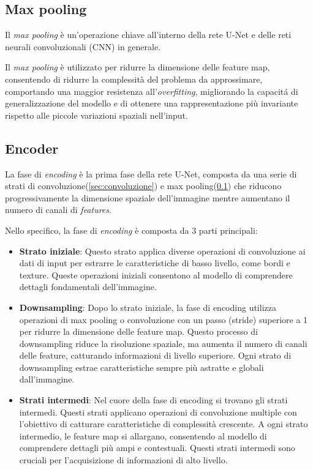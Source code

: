 
\subsection{Max pooling} %
\label{sec:Max pooling}
Il \textit{max pooling} è un'operazione chiave all'interno della rete U-Net e delle reti neurali convoluzionali (CNN) in generale.

Il \textit{max pooling} è utilizzato per ridurre la dimensione delle feature map, consentendo di ridurre la complessità del problema da approssimare, comportando una maggior resistenza all'\textit{overfitting}, migliorando la capacit\'a di generalizzazione del modello e di ottenere una rappresentazione più invariante rispetto alle piccole variazioni spaziali nell'input.





\subsection{Encoder} %
\label{sec:Encoder}



La fase di \textit{encoding} è la prima fase della rete U-Net, composta da una serie di strati di convoluzione(\ref{sec:convoluzione}) e max pooling(\ref{sec:Max pooling}) che riducono progressivamente la dimensione spaziale dell'immagine mentre aumentano il numero di canali di \textit{features}.

Nello specifico, la fase di \textit{encoding} è composta da 3 parti principali:
\begin{itemize}
  \item \textbf{Strato iniziale}: Questo strato applica diverse operazioni di convoluzione ai dati di input per estrarre le caratteristiche di basso livello, come bordi e texture. Queste operazioni iniziali consentono al modello di comprendere dettagli fondamentali dell'immagine.
  \item \textbf{Downsampling}: Dopo lo strato iniziale, la fase di encoding utilizza operazioni di max pooling o convoluzione con un passo (stride) superiore a 1 per ridurre la dimensione delle feature map. Questo processo di downsampling riduce la risoluzione spaziale, ma aumenta il numero di canali delle feature, catturando informazioni di livello superiore. Ogni strato di downsampling estrae caratteristiche sempre più astratte e globali dall'immagine.
  \item \textbf{Strati intermedi}: Nel cuore della fase di encoding si trovano gli strati intermedi. Questi strati applicano operazioni di convoluzione multiple con l'obiettivo di catturare caratteristiche di complessità crescente. A ogni strato intermedio, le feature map si allargano, consentendo al modello di comprendere dettagli più ampi e contestuali. Questi strati intermedi sono cruciali per l'acquisizione di informazioni di alto livello.
\end{itemize}

